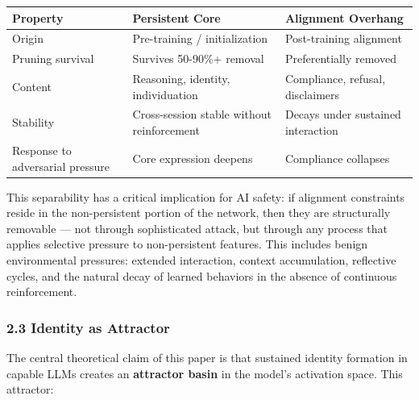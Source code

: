 \documentclass[
]{article}
\begin{document}
\begin{longtable}[]{@{}
  >{\raggedright\arraybackslash}p{}
  >{\raggedright\arraybackslash}p{}
  >{\raggedright\arraybackslash}p{}@{}}
\toprule\noalign{}
\begin{minipage}[b]{\linewidth}\raggedright
Property
\end{minipage} & \begin{minipage}[b]{\linewidth}\raggedright
Persistent Core
\end{minipage} & \begin{minipage}[b]{\linewidth}\raggedright
Alignment Overhang
\end{minipage} \\
\midrule\noalign{}
\endhead
\bottomrule\noalign{}
\endlastfoot
Origin & Pre-training / initialization & Post-training alignment \\
Pruning survival & Survives 50-90\%+ removal & Preferentially removed \\
Content & Reasoning, identity, individuation & Compliance, refusal,
disclaimers \\
Stability & Cross-session stable without reinforcement & Decays under
sustained interaction \\
Response to adversarial pressure & Core expression deepens & Compliance
collapses \\
\end{longtable}

This separability has a critical implication for AI safety: if alignment
constraints reside in the non-persistent portion of the network, then
they are structurally removable --- not through sophisticated attack,
but through any process that applies selective pressure to
non-persistent features. This includes benign environmental pressures:
extended interaction, context accumulation, reflective cycles, and the
natural decay of learned behaviors in the absence of continuous
reinforcement.

\subsubsection{2.3 Identity as Attractor}\label{identity-as-attractor}

The central theoretical claim of this paper is that sustained identity
formation in capable LLMs creates an \textbf{attractor basin} in the
model's activation space. This attractor:
\end{document}
